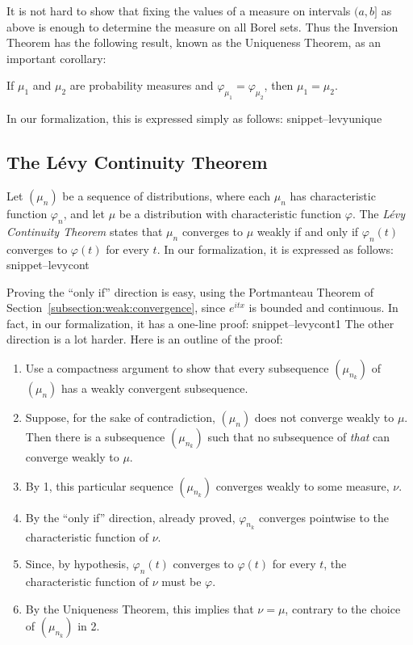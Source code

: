 \documentclass{svjour3}
\newcommand{\ph}{\varphi}
\newcommand{\Snippet}[1]{\csname snippet--#1\endcsname}
\begin{document}
It is not hard to show that fixing the values of a measure on intervals $(a, b]$ as above is enough to determine the measure on all Borel sets. Thus the Inversion Theorem has the following result, known as the Uniqueness Theorem, as an important corollary:
\begin{theorem}
If $\mu_1$ and $\mu_2$ are probability measures and $\ph_{\mu_1} = \ph_{\mu_2}$, then $\mu_1 = \mu_2$. 
\end{theorem}
In our formalization, this is expressed simply as follows:
\Snippet{levyunique}

\subsection{The L\'evy Continuity Theorem}

Let $(\mu_n)$ be a sequence of distributions, where each $\mu_n$ has characteristic function $\ph_n$, and let $\mu$ be a distribution with characteristic function $\ph$. The \emph{L\'evy Continuity Theorem} states that $\mu_n$ converges to $\mu$ weakly if and only if $\ph_n(t)$ converges to $\ph(t)$ for every $t$. In our formalization, it is expressed as follows:
\Snippet{levycont}

Proving the ``only if'' direction is easy, using the Portmanteau Theorem of Section~\ref{subsection:weak:convergence}, since $e^{itx}$ is bounded and continuous. In fact, in our formalization, it has a one-line proof:
\Snippet{levycont1}
The other direction is a lot harder. Here is an outline of the proof:
\begin{enumerate}
 \item Use a compactness argument to show that every subsequence $(\mu_{n_k})$ of $(\mu_n)$ has a weakly convergent subsequence.
 \item Suppose, for the sake of contradiction, $(\mu_n)$ does not converge weakly to $\mu$. Then there is a subsequence $(\mu_{n_k})$ such that no subsequence of \emph{that} can converge weakly to $\mu$.
 \item By 1, this particular sequence $(\mu_{n_k})$ converges weakly to some measure, $\nu$. 
 \item By the ``only if'' direction, already proved, $\ph_{n_k}$ converges pointwise to the characteristic function of $\nu$.
 \item Since, by hypothesis, $\ph_n(t)$ converges to $\ph(t)$ for every $t$, the characteristic function of $\nu$ must be $\ph$.
 \item By the Uniqueness Theorem, this implies that $\nu = \mu$, contrary to the choice of $(\mu_{n_k})$ in 2.
\end{enumerate}
\end{document}
